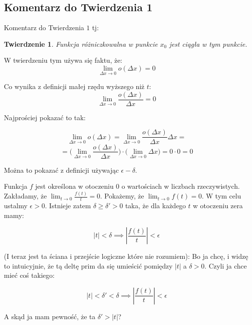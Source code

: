 \documentclass{article}
\newtheorem*{theorem}{Twierdzenie}
\begin{document}
\subsection{Komentarz do Twierdzenia 1}
Komentarz do Twierdzenia \(1\) tj:

\begin{theorem}
    Funkcja różniczkowalna w punkcie \(x_{0}\) jest ciągła w tym punkcie.
\end{theorem}

W twierdzeniu tym używa się faktu, że:
\begin{equation*}
    \lim_{\Delta x \to 0} o(\Delta x) = 0
\end{equation*}

Co wynika z definicji małej rzędu wyższego niż \(t\):
\begin{equation*}
    \lim_{\Delta x \to 0} \frac{o(\Delta x)}{\Delta x} = 0
\end{equation*}

Najprościej pokazać to tak:

\begin{equation*}
    \lim_{\Delta x \to 0} o(\Delta x) =  \lim_{\Delta x \to 0} \frac{o(\Delta x)}{\Delta x}\Delta x =
\end{equation*}
\begin{equation*}
    = \Big(\lim_{\Delta x \to 0} \frac{o(\Delta x)}{\Delta x}\Big)  \cdot \Big(\lim_{\Delta x \to 0} \Delta x\Big) = 0 \cdot 0 = 0
\end{equation*}

Można to pokazać z definicji używając \(\epsilon - \delta\).

\newpage

Funkcja \(f\) jest określona w otoczeniu \(0\) o wartościach w liczbach rzeczywistych.
Zakładamy, że \(\lim_{t \to 0} \frac{f(t)}{t} = 0\). Pokażemy, że 
\(\lim_{t \to 0} f(t) = 0\). W tym celu ustalmy \(\epsilon > 0\). Istnieje zatem
\(\delta \geq \delta' > 0\) taka, że dla każdego \(t\) w otoczeniu zera mamy:

\begin{equation*}
    |t| < \delta \implies |\frac{f(t)}{t}| < \epsilon
\end{equation*}

\par (I teraz jest ta ściana i przejście logiczne które nie rozumiem):
%
Bo ja chcę, i widzę to intuicyjnie, że tą deltę prim da się umieścić pomiędzy \(|t|\)
a \(\delta > 0\). Czyli ja chce mieć coś takiego:

\begin{equation*}
    |t| < \delta' < \delta \implies |\frac{f(t)}{t}| < \epsilon
\end{equation*}

A skąd ja mam pewność, że ta \(\delta' > |t|\)?
\end{document}
